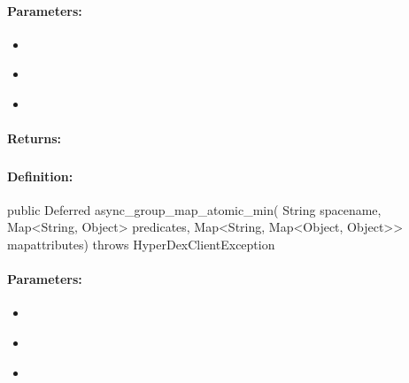 \paragraph{Parameters:}
\begin{itemize}[noitemsep]
\item {}\\

\item {}\\

\item {}\\

\end{itemize}

\paragraph{Returns:}


\pagebreak
\subsubsection{}
\label{api:java:async_group_map_atomic_min}


\paragraph{Definition:}
\begin{javacode}
public Deferred async_group_map_atomic_min(
        String spacename,
        Map<String, Object> predicates,
        Map<String, Map<Object, Object>> mapattributes) throws HyperDexClientException
\end{javacode}

\paragraph{Parameters:}
\begin{itemize}[noitemsep]
\item {}\\

\item {}\\

\item {}\\

\end{itemize}

